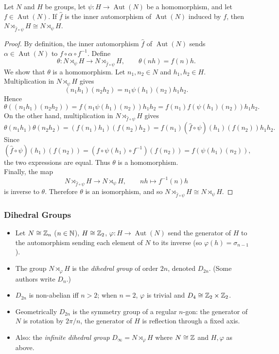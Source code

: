 \documentclass[../Odyssey_Project.tex]{subfiles}
\begin{document}
\begin{proposition}
\label{prop:2.12}
Let $N$ and $H$ be groups, let $\psi : H \to \operatorname{Aut}(N)$ be a homomorphism, and let $f \in \operatorname{Aut}(N)$. If $\hat{f}$ is the inner automorphism of $\operatorname{Aut}(N)$ induced by $f$, then $N \rtimes_{\hat{f} \circ \psi} H \cong N \rtimes_{\psi} H$.
\end{proposition}
\begin{proof}
    By definition, the inner automorphism $\hat{f}$ of $\operatorname{Aut}(N)$ sends $\alpha \in \operatorname{Aut}(N)$ to $f \circ \alpha \circ f^{-1}$. Define
    \[
        \theta \colon N \rtimes_{\psi} H \to N \rtimes_{\hat{f} \circ \psi} H,
        \qquad
        \theta(nh) = f(n)h.
    \]
    We show that $\theta$ is a homomorphism. Let $n_1,n_2 \in N$ and $h_1,h_2 \in H$. Multiplication in $N \rtimes_{\psi} H$ gives
    \[
        (n_1h_1)(n_2h_2) = n_1\psi(h_1)(n_2)h_1h_2.
    \]
    Hence
    \[
        \theta((n_1h_1)(n_2h_2))
        = f(n_1\psi(h_1)(n_2))h_1h_2
        = f(n_1)f(\psi(h_1)(n_2))h_1h_2.
    \]
    On the other hand, multiplication in $N \rtimes_{\hat{f} \circ \psi} H$ gives
    \[
        \theta(n_1h_1)\theta(n_2h_2)
        = (f(n_1)h_1)(f(n_2)h_2)
        = f(n_1)(\hat{f} \circ \psi)(h_1)(f(n_2))h_1h_2.
    \]
    Since
    \[
        (\hat{f} \circ \psi)(h_1)(f(n_2))
        = (f \circ \psi(h_1) \circ f^{-1})(f(n_2))
        = f(\psi(h_1)(n_2)),
    \]
    the two expressions are equal. Thus $\theta$ is a homomorphism. \\
    Finally, the map
    \[
        N \rtimes_{\hat{f} \circ \psi} H \to N \rtimes_{\psi} H,
        \qquad
        nh \mapsto f^{-1}(n)h
    \]
    is inverse to $\theta$. Therefore $\theta$ is an isomorphism, and so $N \rtimes_{\hat{f} \circ \psi} H \cong N \rtimes_{\psi} H$.
\end{proof}

\subsubsection*{Dihedral Groups}
\begin{itemize}
    \item Let $N \cong \mathbb{Z}_n$ ($n \in \mathbb{N}$), $H \cong \mathbb{Z}_2$, $\varphi : H \to \operatorname{Aut}(N)$ send the generator of $H$ to the automorphism sending each element of $N$ to its inverse (so $\varphi(h) = \sigma_{n-1}$).
    \item The group $N \rtimes_{\varphi} H$ is the \emph{dihedral group} of order $2n$, denoted $D_{2n}$. (Some authors write $D_n$.)
    \item $D_{2n}$ is non-abelian iff $n > 2$; when $n = 2$, $\varphi$ is trivial and $D_4 \cong \mathbb{Z}_2 \times \mathbb{Z}_2$.
    \item Geometrically $D_{2n}$ is the symmetry group of a regular $n$-gon: the generator of $N$ is rotation by $2\pi/n$, the generator of $H$ is reflection through a fixed axis.
    \item Also: the \emph{infinite dihedral group} $D_\infty = N \rtimes_{\varphi} H$ where $N \cong \mathbb{Z}$ and $H, \varphi$ as above.
\end{itemize}
\end{document}
